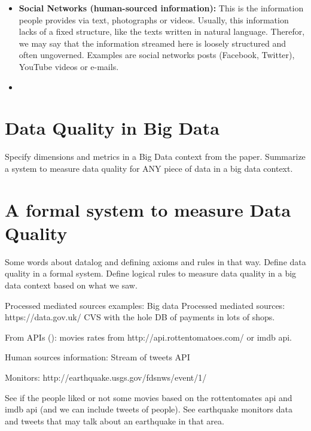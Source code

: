\documentclass[%
 reprint,
 amsmath,amssymb,
 aps,
]{revtex4-1}
\begin{document}
\begin{itemize}
  \item \textbf{Social Networks (human-sourced information):} This is the information people provides via text, photographs or videos. Usually, this information lacks of a fixed structure, like the texts written in natural language. Therefor, we may say that the information streamed here is loosely structured and often ungoverned. Examples are social networks posts (Facebook, Twitter), YouTube videos or e-mails.
  \item \textbf{}
\end{itemize}

\section{\label{sec:level1}Data Quality in Big Data}

Specify dimensions and metrics in a Big Data context from the paper.
Summarize a system to measure data quality for ANY piece of data in a big data context.

\section{\label{sec:level1}A formal system to measure Data Quality}

Some words about datalog and defining axioms and rules in that way.
Define data quality in a formal system.
Define logical rules to measure data quality in a big data context based on what we saw.

Processed mediated sources examples:
Big data Processed mediated sources: https://data.gov.uk/ CVS with the hole DB of payments in lots of shops.

From APIs (): movies rates from http://api.rottentomatoes.com/ or imdb api.

Human sources information:
Stream of tweets API

Monitors:
http://earthquake.usgs.gov/fdsnws/event/1/

See if the people liked or not some movies based on the rottentomates api and imdb api (and we can include tweets of people).
See earthquake monitors data and tweets that may talk about an earthquake in that area.
\end{document}
